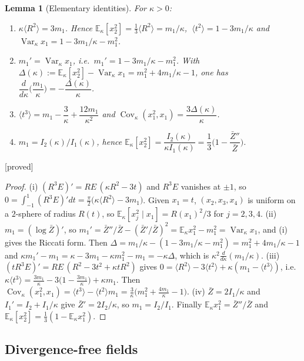 \documentclass[11pt,a4paper]{article}
\newtheorem{lemma}[theorem]{Lemma}
\theoremstyle{remark}
\theoremstyle{definition}
\theoremstyle{plain}
\theoremstyle{remark}
\newcommand{\E}{\mathbb{E}}
\newcommand{\Cov}{\operatorname{Cov}}
\newcommand{\Var}{\operatorname{Var}}
\newcommand{\st}[1]{\textsf{[#1]}}
\newcommand{\Zb}{\bar Z}
\begin{document}
\begin{lemma}[Elementary identities]\label{lem:ident}
For $\kappa>0$:
\begin{enumerate}
\item[(i)] $\kappa\langle R^2\rangle=3m_1$. Hence $\E_\kappa[x_2^2]=\frac13\langle R^2\rangle=m_1/\kappa$, $\ \langle t^2\rangle=1-3m_1/\kappa$ and
$\Var_\kappa x_1=1-3m_1/\kappa-m_1^2$.
\item[(ii)] $m_1'=\Var_\kappa x_1$, i.e.\ $m_1'=1-3m_1/\kappa-m_1^2$. With $\Delta(\kappa):=\E_\kappa[x_2^2]-\Var_\kappa x_1=m_1^2+4m_1/\kappa-1$,
one has $\dfrac{d}{d\kappa}\Big(\dfrac{m_1}\kappa\Big)=-\dfrac{\Delta(\kappa)}\kappa$.
\item[(iii)] $\langle t^3\rangle=m_1-\dfrac3\kappa+\dfrac{12m_1}{\kappa^2}$ and $\Cov_\kappa(x_1^2,x_1)=\dfrac{3\Delta(\kappa)}\kappa$.
\item[(iv)] $m_1=I_2(\kappa)/I_1(\kappa)$, hence $\E_\kappa[x_2^2]=\dfrac{I_2(\kappa)}{\kappa I_1(\kappa)}=\dfrac13\Big(1-\dfrac{\Zb''}{\Zb}\Big)$.
\end{enumerate}
\end{lemma}
\noindent\st{proved}
\begin{proof}
(i) $(R^3E)'=RE\,(\kappa R^2-3t)$ and $R^3E$ vanishes at $\pm1$, so $0=\int_{-1}^1(R^3E)'dt=\frac\pi2\big(\kappa\langle R^2\rangle-3m_1\big)$.
Given $x_1=t$, $(x_2,x_3,x_4)$ is uniform on a $2$-sphere of radius $R(t)$, so $\E_\kappa[x_j^2\mid x_1]=R(x_1)^2/3$ for $j=2,3,4$.
(ii) $m_1=(\log\Zb)'$, so $m_1'=\Zb''/\Zb-(\Zb'/\Zb)^2=\E_\kappa x_1^2-m_1^2=\Var_\kappa x_1$, and (i) gives the Riccati form.
Then $\Delta=m_1/\kappa-(1-3m_1/\kappa-m_1^2)=m_1^2+4m_1/\kappa-1$ and
$\kappa m_1'-m_1=\kappa-3m_1-\kappa m_1^2-m_1=-\kappa\Delta$, which is $\kappa^2\frac{d}{d\kappa}(m_1/\kappa)$.
(iii) $(tR^3E)'=RE\,(R^2-3t^2+\kappa tR^2)$ gives $0=\langle R^2\rangle-3\langle t^2\rangle+\kappa(m_1-\langle t^3\rangle)$, i.e.
$\kappa\langle t^3\rangle=\frac{3m_1}\kappa-3\big(1-\frac{3m_1}\kappa\big)+\kappa m_1$. Then
$\Cov_\kappa(x_1^2,x_1)=\langle t^3\rangle-\langle t^2\rangle m_1=\frac3\kappa\big(m_1^2+\frac{4m_1}\kappa-1\big)$.
(iv) $\Zb=2I_1/\kappa$ and $I_1'=I_2+I_1/\kappa$ give $\Zb'=2I_2/\kappa$, so $m_1=I_2/I_1$. Finally $\E_\kappa x_1^2=\Zb''/\Zb$ and
$\E_\kappa[x_2^2]=\frac13(1-\E_\kappa x_1^2)$.
\end{proof}

\subsection{Divergence-free fields}\label{sec:chfield}
\end{document}
